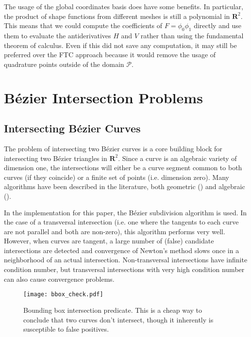 \documentclass[oneside, reqno]{amsart}
\theoremstyle{definition}
\newcommand{\reals}{\mathbf{R}}
\begin{document}
The usage of the global coordinates basis does have some benefits.
In particular, the product of shape functions from different meshes
is still a polynomial in \(\reals^2\). This means that we could
compute the coefficients of \(F = \phi_0 \phi_1\) directly and
use them to evaluate the antiderivatives \(H\) and \(V\) rather
than using the fundamental theorem of calculus. Even if this
did not save any computation, it may still be preferred over
the FTC approach because it would remove the usage of quadrature
points outside of the domain \(\mathcal{P}\).




\appendix

\section{B\'{e}zier Intersection Problems}\label{sec:bezier-intersection}

\subsection{Intersecting B\'{e}zier Curves}

The problem of intersecting two B\'{e}zier curves is a core building
block for intersecting two B\'{e}zier triangles in \(\reals^2\).
Since a curve is an algebraic variety of dimension one,
the intersections will either be a curve segment common to both curves (if
they coincide) or a finite set of points (i.e. dimension zero).
Many algorithms have been described in the literature, both
geometric (\cite{Sederberg1986, Sederberg1990, Kim1998}) and
algebraic (\cite{Manocha:CSD-92-698}).

In the implementation for this paper, the B\'{e}zier subdivision
algorithm is used.
In the case of a transversal intersection (i.e. one where the
tangents to each curve are not parallel and both are non-zero),
this algorithm performs very well. However, when curves are tangent,
a large number of (false) candidate intersections are detected and
convergence of Newton's method slows once in a neighborhood of an
actual intersection. Non-transversal intersections
have infinite condition number, but transversal intersections with
very high condition number can also cause convergence problems.

\begin{figure}
  \texttt{[image: bbox\_check.pdf]}
  \centering
  \captionsetup{width=.75\linewidth}
  \caption{Bounding box intersection predicate. This is a cheap way to
    conclude that two curves don't intersect, though it inherently is
    susceptible to false positives.}
  \label{fig:bounding-box-check}
\end{figure}
\end{document}
